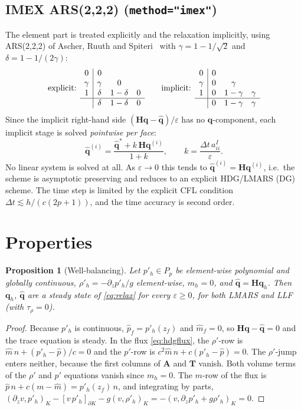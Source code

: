 \documentclass[11pt,a4paper]{article}
\newtheorem{proposition}{Proposition}
\newcommand{\qh}{\hat{\bm q}}
\newcommand{\q}{\bm q}
\begin{document}
\subsection{IMEX ARS(2,2,2) (\texttt{method="imex"})}
The element part is treated explicitly and the relaxation implicitly, using ARS(2,2,2) of
Ascher, Ruuth and Spiteri~\cite{ars} with $\gamma=1-1/\sqrt2$ and $\delta=1-1/(2\gamma)$:
\[
\text{explicit: }
\begin{array}{c|ccc}0&0\\\gamma&\gamma&0\\1&\delta&1-\delta&0\\\hline&\delta&1-\delta&0\end{array}
\qquad
\text{implicit: }
\begin{array}{c|ccc}0&0\\\gamma&0&\gamma\\1&0&1-\gamma&\gamma\\\hline&0&1-\gamma&\gamma\end{array}
\]
Since the implicit right-hand side $(\bm H\q-\qh)/\varepsilon$ has no $\q$-component, each
implicit stage is solved \emph{pointwise per face}:
\begin{equation}
\qh^{(i)} = \frac{\qh^{\ast}+k\,\bm H\q^{(i)}}{1+k},\qquad k=\frac{\Delta t\,a^I_{ii}}{\varepsilon}.
\end{equation}
No linear system is solved at all. As $\varepsilon\to0$ this tends to $\qh^{(i)}=\bm H\q^{(i)}$,
i.e.\ the scheme is asymptotic preserving and reduces to an explicit HDG/LMARS (DG) scheme. The
time step is limited by the explicit CFL condition $\Delta t\lesssim h/(c(2p+1))$, and the
time accuracy is second order.

\section{Properties}
\begin{proposition}[Well-balancing]
Let $p'_h\in P_p$ be element-wise polynomial and globally continuous, $\rho'_h=-\partial_z p'_h/g$
element-wise, $m_h=0$, and $\qh=\bm H\q_h$. Then $\q_h$, $\qh$ are a steady state of
\eqref{eq:relax} for every $\varepsilon\ge0$, for both LMARS and LLF (with $\tau_\rho=0$).
\end{proposition}
\begin{proof}
Because $p'_h$ is continuous, $\hat p_f=p'_h(z_f)$ and $\hat m_f=0$, so $\bm H\q-\qh=0$ and the
trace equation is steady. In the flux \eqref{eq:hdgflux}, the $\rho'$-row is
$\hat m\,n+(p'_h-\hat p)/c=0$ and the $p'$-row is $c^2\hat m\,n+c(p'_h-\hat p)=0$. The
$\rho'$-jump enters neither, because the first columns of $\bm A$ and $\bm T$ vanish. Both volume
terms of the $\rho'$ and $p'$ equations vanish since $m_h=0$. The $m$-row of the flux is
$\hat p\,n+c(m-\hat m)=p'_h(z_f)\,n$, and integrating by parts,
$(\partial_z v,p'_h)_K-[v\,p'_h]_{\partial K}-g(v,\rho'_h)_K = -(v,\partial_zp'_h+g\rho'_h)_K=0$.
\end{proof}
\end{document}
